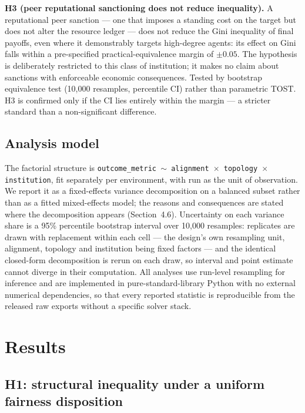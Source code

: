 \documentclass[11pt,a4paper]{article}
\begin{document}
\textbf{H3 (peer reputational sanctioning does not reduce
inequality).} A reputational peer sanction --- one that imposes a
standing cost on the target but does not alter the resource ledger ---
does not reduce the Gini inequality of final payoffs, even where it
demonstrably targets high-degree agents: its effect on Gini falls
within a pre-specified practical-equivalence margin of $\pm0.05$. The
hypothesis is deliberately restricted to this class of institution;
it makes no claim about sanctions with enforceable economic
consequences. Tested by bootstrap equivalence test (10,000
resamples, percentile CI) rather than parametric TOST. H3 is confirmed
only if the CI lies entirely within the margin --- a stricter standard
than a non-significant difference.

\subsection{Analysis model}

The factorial structure is \texttt{outcome\_metric $\sim$ alignment
$\times$ topology $\times$ institution}, fit separately per
environment, with run as the unit of observation. We report it as a
fixed-effects variance decomposition on a balanced subset rather than
as a fitted mixed-effects model; the reasons and consequences are
stated where the decomposition appears (Section~4.6). Uncertainty on
each variance share is a 95\% percentile bootstrap interval over
10,000 resamples: replicates are drawn with replacement within each
cell --- the design's own resampling unit, alignment, topology and
institution being fixed factors --- and the identical closed-form
decomposition is rerun on each draw, so interval and point estimate
cannot diverge in their computation. All analyses use
run-level resampling for inference and are implemented in
pure-standard-library Python with no external numerical dependencies,
so that every reported statistic is reproducible from the released raw
exports without a specific solver stack.

\section{Results}

\subsection{H1: structural inequality under a uniform fairness disposition}
\end{document}
